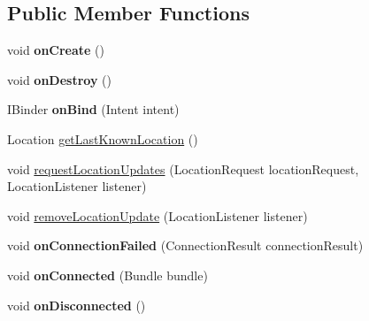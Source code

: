 \subsection*{Public Member Functions}
\begin{DoxyCompactItemize}
\item 
\hypertarget{classcom_1_1qualoutdoor_1_1recorder_1_1location_1_1LocationService_a3623b9672d920fec14ebf48c94bc0bba}{void {\bfseries on\-Create} ()}\label{classcom_1_1qualoutdoor_1_1recorder_1_1location_1_1LocationService_a3623b9672d920fec14ebf48c94bc0bba}

\item 
\hypertarget{classcom_1_1qualoutdoor_1_1recorder_1_1location_1_1LocationService_ab35817d1fb418b4e4c412cc38333179f}{void {\bfseries on\-Destroy} ()}\label{classcom_1_1qualoutdoor_1_1recorder_1_1location_1_1LocationService_ab35817d1fb418b4e4c412cc38333179f}

\item 
\hypertarget{classcom_1_1qualoutdoor_1_1recorder_1_1location_1_1LocationService_aedf91ee366c1866c7b46278267dbece2}{I\-Binder {\bfseries on\-Bind} (Intent intent)}\label{classcom_1_1qualoutdoor_1_1recorder_1_1location_1_1LocationService_aedf91ee366c1866c7b46278267dbece2}

\item 
Location \hyperlink{classcom_1_1qualoutdoor_1_1recorder_1_1location_1_1LocationService_a574473b9ffe0f5313210d299df2cefaa}{get\-Last\-Known\-Location} ()
\item 
void \hyperlink{classcom_1_1qualoutdoor_1_1recorder_1_1location_1_1LocationService_a1009c8b09c3497ee35ade5396f9ccb18}{request\-Location\-Updates} (Location\-Request location\-Request, Location\-Listener listener)
\item 
void \hyperlink{classcom_1_1qualoutdoor_1_1recorder_1_1location_1_1LocationService_a3c6aad1fa5f2311357bd762861d9a7c9}{remove\-Location\-Update} (Location\-Listener listener)
\item 
\hypertarget{classcom_1_1qualoutdoor_1_1recorder_1_1location_1_1LocationService_a64a91b71c1eca7764d4c43d7c69ea509}{void {\bfseries on\-Connection\-Failed} (Connection\-Result connection\-Result)}\label{classcom_1_1qualoutdoor_1_1recorder_1_1location_1_1LocationService_a64a91b71c1eca7764d4c43d7c69ea509}

\item 
\hypertarget{classcom_1_1qualoutdoor_1_1recorder_1_1location_1_1LocationService_a5c9f3f425c9cb88ce4f67257de846a14}{void {\bfseries on\-Connected} (Bundle bundle)}\label{classcom_1_1qualoutdoor_1_1recorder_1_1location_1_1LocationService_a5c9f3f425c9cb88ce4f67257de846a14}

\item 
\hypertarget{classcom_1_1qualoutdoor_1_1recorder_1_1location_1_1LocationService_a5c612c5f05feef63ff7a108c790742cb}{void {\bfseries on\-Disconnected} ()}\label{classcom_1_1qualoutdoor_1_1recorder_1_1location_1_1LocationService_a5c612c5f05feef63ff7a108c790742cb}

\end{DoxyCompactItemize}
